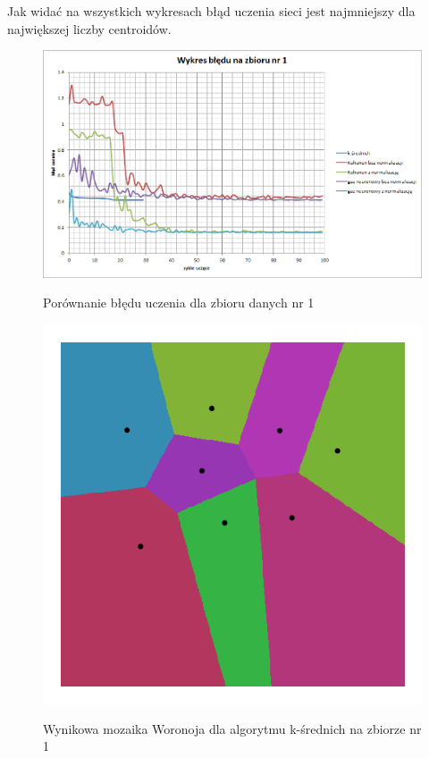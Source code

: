 \documentclass{classrep}
\begin{document}
Jak widać na wszystkich wykresach błąd uczenia sieci jest najmniejszy dla największej liczby centroidów.
\clearpage

\begin{figure}[h]
	\centering
		\includegraphics[scale=0.55]{pictures/183566_1.png}
	\label{fig:183566_1}
	\caption{Porównanie błędu uczenia dla zbioru danych nr 1}
\end{figure}

\begin{figure}[h]
	\centering
		\includegraphics[scale=0.55]{pictures/kmeans_8_neuronow_zbior_0.png}
	\label{fig:kmeans_8_neuronow_zbior_0}
	\caption{Wynikowa mozaika Woronoja dla algorytmu k-średnich na zbiorze nr 1}
\end{figure}
\end{document}
